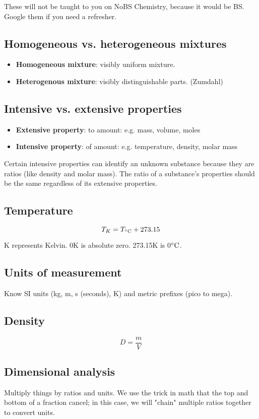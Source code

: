 \documentclass[letterpaper, 12pt]{article}
\begin{document}
These will not be taught to you on NoBS Chemistry, because it would be BS. Google them if you need a refresher.

	\subsection{Homogeneous vs. heterogeneous mixtures}
	\begin{itemize}
		\item \textbf{Homogeneous mixture}: visibly uniform mixture.
		\item \textbf{Heterogenous mixture}: visibly distinguishable parts. (Zumdahl)
	\end{itemize}

	\subsection{Intensive vs. extensive properties}
	\begin{itemize}
		\item \textbf{Extensive property}:  to amount: e.g. mass, volume, moles
		\item \textbf{Intensive property}:  of amount: e.g. temperature, density, molar mass
	\end{itemize}
	
	Certain intensive properties can identify an unknown substance because they are ratios (like density and molar mass). The ratio of a substance's properties should be the same regardless of its extensive properties.
	
	\subsection{Temperature}
	$$T_{K} = T_{^{\circ}{\rm C}} + 273.15$$
	
	K represents Kelvin. 0K is absolute zero. 273.15K is 0$^{\circ}{\rm C}$.
	
	\subsection{Units of measurement}
	Know SI units (kg, m, s (seconds), K) and metric prefixes (pico to mega).
	
	\subsection{Density}
	$$D = \frac{m}{V}$$
	
	\subsection{Dimensional analysis}
	Multiply things by ratios and units. We use the trick in math that the top and bottom of a fraction cancel; in this case, we will "chain" multiple ratios together to convert units.
	
\end{document}
